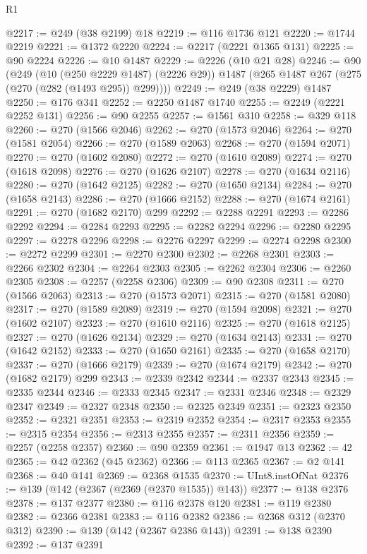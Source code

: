 \begin{lexlean}{R1}
\begin{coremodule}
@2217 := @249 (@38 @2199) @18
@2219 := @116 @1736 @121
@2220 := @1744 @2219
@2221 := @1372 @2220
@2224 := @2217 (@2221 @1365 @131)
@2225 := @90 @2224
@2226 := @10 @1487
@2229 := @2226 (@10 @21 @28)
@2246 := @90
    (@249
      (@10 (@250 @2229 @1487) (@2226 @29))
      @1487
      (@265 @1487 @267 (@275 (@270 (@282 (@1493 @295)) @299))))
@2249 := @249 (@38 @2229) @1487
@2250 := @176 @341
@2252 := @2250 @1487 @1740
@2255 := @2249 (@2221 @2252 @131)
@2256 := @90 @2255
@2257 := @1561 @310
@2258 := @329 @118
@2260 := @270 (@1566 @2046)
@2262 := @270 (@1573 @2046)
@2264 := @270 (@1581 @2054)
@2266 := @270 (@1589 @2063)
@2268 := @270 (@1594 @2071)
@2270 := @270 (@1602 @2080)
@2272 := @270 (@1610 @2089)
@2274 := @270 (@1618 @2098)
@2276 := @270 (@1626 @2107)
@2278 := @270 (@1634 @2116)
@2280 := @270 (@1642 @2125)
@2282 := @270 (@1650 @2134)
@2284 := @270 (@1658 @2143)
@2286 := @270 (@1666 @2152)
@2288 := @270 (@1674 @2161)
@2291 := @270 (@1682 @2170) @299
@2292 := @2288 @2291
@2293 := @2286 @2292
@2294 := @2284 @2293
@2295 := @2282 @2294
@2296 := @2280 @2295
@2297 := @2278 @2296
@2298 := @2276 @2297
@2299 := @2274 @2298
@2300 := @2272 @2299
@2301 := @2270 @2300
@2302 := @2268 @2301
@2303 := @2266 @2302
@2304 := @2264 @2303
@2305 := @2262 @2304
@2306 := @2260 @2305
@2308 := @2257 (@2258 @2306)
@2309 := @90 @2308
@2311 := @270 (@1566 @2063)
@2313 := @270 (@1573 @2071)
@2315 := @270 (@1581 @2080)
@2317 := @270 (@1589 @2089)
@2319 := @270 (@1594 @2098)
@2321 := @270 (@1602 @2107)
@2323 := @270 (@1610 @2116)
@2325 := @270 (@1618 @2125)
@2327 := @270 (@1626 @2134)
@2329 := @270 (@1634 @2143)
@2331 := @270 (@1642 @2152)
@2333 := @270 (@1650 @2161)
@2335 := @270 (@1658 @2170)
@2337 := @270 (@1666 @2179)
@2339 := @270 (@1674 @2179)
@2342 := @270 (@1682 @2179) @299
@2343 := @2339 @2342
@2344 := @2337 @2343
@2345 := @2335 @2344
@2346 := @2333 @2345
@2347 := @2331 @2346
@2348 := @2329 @2347
@2349 := @2327 @2348
@2350 := @2325 @2349
@2351 := @2323 @2350
@2352 := @2321 @2351
@2353 := @2319 @2352
@2354 := @2317 @2353
@2355 := @2315 @2354
@2356 := @2313 @2355
@2357 := @2311 @2356
@2359 := @2257 (@2258 @2357)
@2360 := @90 @2359
@2361 := @1947 @13
@2362 := 42
@2365 := @42 @2362 (@45 @2362)
@2366 := @113 @2365
@2367 := @2 @141
@2368 := @40 @141
@2369 := @2368 @1535
@2370 := UInt8.instOfNat
@2376 := @139 (@142 (@2367 (@2369 (@2370 @1535)) @143))
@2377 := @138 @2376
@2378 := @137 @2377
@2380 := @116 @2378 @120
@2381 := @119 @2380
@2382 := @2366 @2381
@2383 := @116 @2382
@2386 := @2368 @312 (@2370 @312)
@2390 := @139 (@142 (@2367 @2386 @143))
@2391 := @138 @2390
@2392 := @137 @2391

\end{coremodule}
\end{lexlean}
